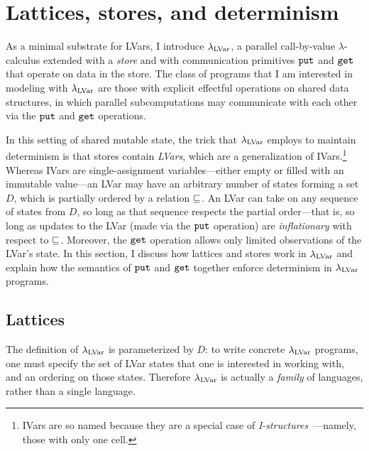 \section{Lattices, stores, and determinism}\label{s:lvars-lattices}

As a minimal substrate for LVars, I introduce $\lambda_{\textrm{LVar}}$, a
 parallel call-by-value $\lambda$-calculus extended with
 a \emph{store} and with communication primitives $\mbox{\texttt{put}}$ and $\mbox{\texttt{get}}$
 that operate on data in the store.  The class of programs that I am
 interested in modeling with $\lambda_{\textrm{LVar}}$ are those with explicit
 effectful operations on shared data structures, in which parallel
 subcomputations may communicate with each other via the $\mbox{\texttt{put}}$ and
 $\mbox{\texttt{get}}$ operations.

In this setting of shared mutable state, the trick that $\lambda_{\textrm{LVar}}$
employs to maintain determinism is that stores contain \emph{LVars},
which are a generalization of IVars.\footnote{IVars are so named
because they are a special case
of \emph{I-structures}~\cite{IStructures}---namely, those with only
one cell.}  Whereas IVars are single-assignment variables---either
empty or filled with an immutable value---an LVar may have an
arbitrary number of states forming a set $D$, which is partially
ordered by a relation $\sqsubseteq$.  An LVar can take on any sequence of
states from $D$, so long as that sequence respects the partial
order---that is, so long as updates to the LVar (made via the $\mbox{\texttt{put}}$
operation) are \emph{inflationary} with respect to $\sqsubseteq$.
Moreover, the $\mbox{\texttt{get}}$ operation allows only limited observations of the
LVar's state.  In this section, I discuss how lattices and stores work
in $\lambda_{\textrm{LVar}}$ and explain how the semantics of $\mbox{\texttt{put}}$ and $\mbox{\texttt{get}}$
together enforce determinism in $\lambda_{\textrm{LVar}}$ programs.

\subsection{Lattices}\label{subsection:lvars-lattices}

The definition of $\lambda_{\textrm{LVar}}$ is parameterized by $D$: to write
concrete $\lambda_{\textrm{LVar}}$ programs, one must specify the set of LVar
states that one is interested in working with, and an ordering on
those states.  Therefore $\lambda_{\textrm{LVar}}$ is actually a \emph{family} of
languages, rather than a single language.

